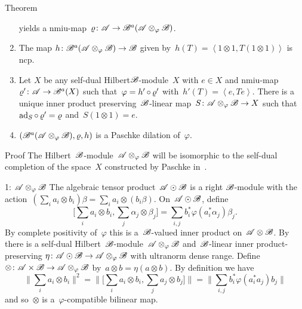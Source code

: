 \documentclass[b]{subfiles}
\begin{document}
\begin{parsec}
\begin{point}{Theorem}
\begin{enumerate}
        yields a
        nmiu-map~$\varrho\colon \mathscr{A} \to \mathscr{B}^a(\mathscr{A}\otimes_\varphi \mathscr{B})$.
\item
    The map
    $h\colon \mathscr{B}^a(\mathscr{A}\otimes_\varphi\mathscr{B}) \to \mathscr{B}$
    given by~$h(T) =\left<1 \otimes 1, T(1 \otimes 1)\right>$
    is ncp.
\item
Let $X$ be any  self-dual Hilbert$\mathscr{B}$-module~$X$ with $e \in X$ and
        nmiu-map~$\varrho'\colon \mathscr{A} \to \mathscr{B}^a(X)$
        such that~$\varphi  = h' \mathop{\circ} \varrho'$
        with~$h'(T) = \left<e,T e\right>$.
There is a unique
        inner product preserving~$\mathscr{B}$-linear
        map~$S \colon \mathscr{A}\otimes_\varphi\mathscr{B} \to X$
        such that~$\mathrm{ad}_S \mathop{\circ} \varrho' = \varrho$
        and~$S( 1\otimes 1) = e$.
\item
$(\mathscr{B}^a(\mathscr{A} \otimes_\varphi \mathscr{B}), \varrho, h)$
    is a Paschke dilation of~$\varphi$.
\end{enumerate}
\begin{point}{Proof}%
The Hilbert~$\mathscr{B}$-module~$\mathscr{A} \otimes_\varphi \mathscr{B}$
    will be isomorphic to the self-dual completion of the space~$X$
    constructed by Paschke in~\cite[Thm.~5.2]{paschke}.
\begin{point}{1: $\mathscr{A} \otimes_\varphi \mathscr{B}$}%
The algebraic tensor product~$\mathscr{A} \odot \mathscr{B}$
    is a right $\mathscr{B}$-module
with the action~$(\sum_i a_i \otimes b_i)\beta = \sum_i a_i \otimes(b_i\beta)$.
On~$\mathscr{A} \odot \mathscr{B}$, define
\begin{equation*}
    \bigl[\sum_i a_i \otimes b_i, \sum_j \alpha_j \otimes \beta_j\bigr]
    = \sum_{i,j} b_i^* \varphi(a_i^*\alpha_j)\beta_j.
\end{equation*}
By complete positivity of~$\varphi$
this is a~$\mathscr{B}$-valued inner product on~$\mathscr{A} \otimes \mathscr{B}$.
By 
    there is a self-dual Hilbert~$\mathscr{B}$-module~$\mathscr{A}\otimes_\varphi \mathscr{B}$
    and~$\mathscr{B}$-linear inner product-preserving
    $\eta\colon \mathscr{A} \odot \mathscr{B} \to \mathscr{A} \otimes_\varphi \mathscr{B}$
    with ultranorm dense range.
Define~$\otimes \colon \mathscr{A} \times \mathscr{B} \to \mathscr{A} \otimes_\varphi \mathscr{B}$
    by~$a \otimes b = \eta(a \otimes b)$.
By definition we have
\begin{equation*}
\bigl\| \sum_i a_i \otimes b_i \bigr\|^2
    = \bigl\|\bigl[ \sum_i a_i\otimes b_i, \sum_j a_j \otimes b_j \bigr]\bigr\|
    = \bigl\|\sum_{i,j} b_i^* \varphi(a_i^*a_j) b_j\bigr\|
\end{equation*}
and so~$\otimes$ is a~$\varphi$-compatible bilinear map.


\end{point}
\end{point}
\end{point}
\end{parsec}
\end{document}
